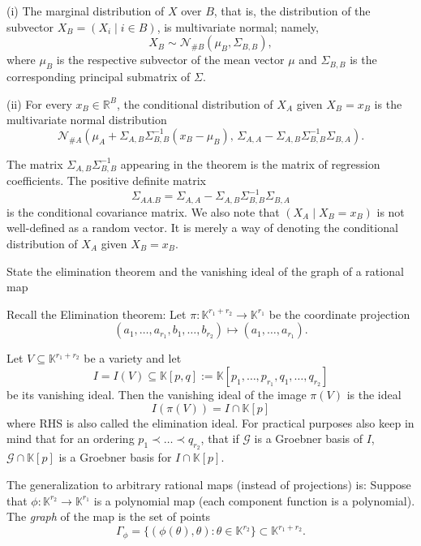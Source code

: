 (i) The marginal distribution of \( X \) over \( B \), that is, the distribution of the subvector \( X_B = (X_i \mid i \in B) \), 
is multivariate normal; namely,
\[
X_B \sim \mathcal{N}_{\#B}(\mu_B, \Sigma_{B,B}),
\]
where \( \mu_B \) is the respective subvector of the mean vector \( \mu \) and \( \Sigma_{B,B} \) is the corresponding principal submatrix of 
\( \Sigma \).

(ii) For every \( x_B \in \mathbb{R}^B \), the conditional distribution of \( X_A \) given \( X_B = x_B \) is the multivariate normal distribution
\[
\mathcal{N}_{\#A}\left( \mu_A + \Sigma_{A,B}\Sigma_{B,B}^{-1}(x_B - \mu_B),\, \Sigma_{A,A} - \Sigma_{A,B}\Sigma_{B,B}^{-1}\Sigma_{B,A} \right).
\]

The matrix \( \Sigma_{A,B}\Sigma_{B,B}^{-1} \) appearing in the theorem is the matrix of regression coefficients. The positive definite matrix
\[
\Sigma_{AA.B} = \Sigma_{A,A} - \Sigma_{A,B}\Sigma_{B,B}^{-1}\Sigma_{B,A}
\]
is the conditional covariance matrix. We also note that \( (X_A \mid X_B = x_B) \) is not well-defined as a random vector. It is merely a way of denoting the conditional distribution of \( X_A \) given \( X_B = x_B \).



State the elimination theorem and the vanishing ideal of the graph of a rational map


Recall the Elimination theorem:
Let \(\pi : \mathbb{K}^{r_1 + r_2} \to \mathbb{K}^{r_1}\) be the coordinate projection
\[
(a_1, \ldots, a_{r_1}, b_1, \ldots, b_{r_2}) \mapsto (a_1, \ldots, a_{r_1}).
\]

Let \(V \subseteq \mathbb{K}^{r_1 + r_2}\) be a variety and let
\[
I = I(V) \subseteq \mathbb{K}[p, q] := \mathbb{K}[p_1, \ldots, p_{r_1}, q_1, \ldots, q_{r_2}]
\]
be its vanishing ideal. Then the vanishing ideal of the image \( \pi(V) \) is the
ideal
\[ I(\pi(V)) = I \cap \mathbb{K}[p] \]
where RHS is also called the elimination ideal.
For practical purposes also keep in mind that for an ordering \( p_1 \prec \dots \prec q_{r_2} \),
that if \( \mathcal{G} \) is a Groebner basis of \( I \), \( \mathcal{G} \cap \mathbb{K}[p] \) is a Groebner basis
for \( I \cap \mathbb{K}[p] \).

The generalization to arbitrary rational maps (instead of projections) is:
Suppose that \(\phi : \mathbb{K}^{r_2} \to \mathbb{K}^{r_1}\) is a polynomial map (each component function is a polynomial). The \emph{graph} of the map is the set of points
\[
\Gamma_\phi = \{ (\phi(\theta), \theta) : \theta \in \mathbb{K}^{r_2} \} \subset \mathbb{K}^{r_1 + r_2}.
\]

